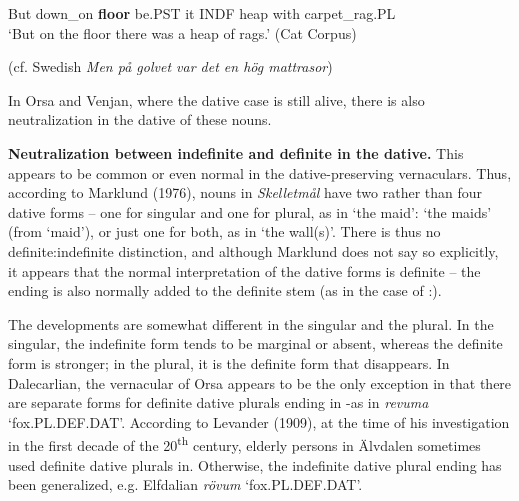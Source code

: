 But  down\_on  \textbf{floor} be.PST  it  INDF  heap  with  carpet\_rag.PL\\ %


‘But on the floor there was a heap of rags.’ (Cat Corpus)
\z

(cf. Swedish \textit{Men på golvet var det en hög mattrasor})

In Orsa and Venjan, where the dative case is still alive, there is also neutralization in the dative of these nouns. 

\textbf{Neutralization between indefinite and definite in the dative.} This appears to be common or even normal in the dative-preserving vernaculars. Thus, according to Marklund (1976), nouns in \textit{Skelletmål} have two rather than four dative forms – one for singular and one for plural, as in  ‘the maid’:  ‘the maids’ (from  ‘maid’), or just one for both, as in ‘the wall(s)’. There is thus no definite:indefinite distinction, and although Marklund does not say so explicitly, it appears that the normal interpretation of the dative forms is definite – the ending is also normally added to the definite stem (as in the case of :).

The developments are somewhat different in the singular and the plural. In the singular, the indefinite form tends to be marginal or absent, whereas the definite form is stronger; in the plural, it is the definite form that disappears. In Dalecarlian,  the vernacular of Orsa appears to be the only exception in that there are separate forms for definite dative plurals ending in \nobreakdash-as in \textit{revuma} ‘fox.PL.DEF.DAT’. According to Levander\textsc{ (1909)}, at the time of his investigation in the first decade of the 20\textsuperscript{th} century, elderly persons in Älvdalen sometimes used definite dative plurals in\textstyleLinguisticExample{ }.  Otherwise, the indefinite dative plural ending  has been generalized, e.g. Elfdalian \textit{rövum} ‘fox.PL.DEF.DAT’.

